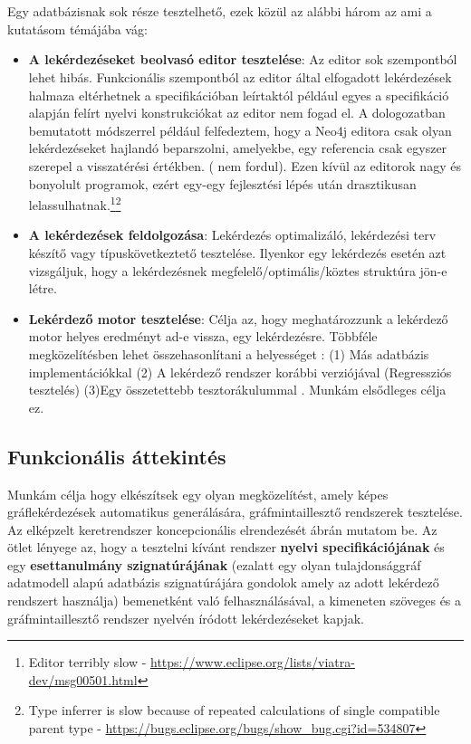 \chapter{\attekintes}

Egy adatbázisnak sok része tesztelhető, ezek közül az alábbi három az ami a kutatásom témájába vág:
\begin{itemize}
	\item  \textbf{A lekérdezéseket beolvasó editor tesztelése}: Az editor sok szempontból lehet hibás. Funkcionális szempontból az editor által elfogadott lekérdezések halmaza eltérhetnek a specifikációban leírtaktól például egyes a specifikáció alapján felírt nyelvi konstrukciókat az editor nem fogad el. A dologozatban bemutatott módszerrel például felfedeztem, hogy a Neo4j  editora csak olyan lekérdezéseket hajlandó beparszolni, amelyekbe, egy referencia csak egyszer szerepel a visszatérési értékben. ( nem fordul). Ezen kívül az editorok nagy és bonyolult programok, ezért egy-egy fejlesztési lépés után drasztikusan lelassulhatnak.\footnote{Editor terribly slow - \url{https://www.eclipse.org/lists/viatra-dev/msg00501.html}}\footnote{Type inferrer is slow because of repeated calculations of single compatible parent type - \url{https://bugs.eclipse.org/bugs/show_bug.cgi?id=534807}}
	\item \textbf{A lekérdezések feldolgozása}: Lekérdezés optimalizáló, lekérdezési terv készítő vagy típuskövetkeztető tesztelése. Ilyenkor egy lekérdezés esetén azt vizsgáljuk, hogy a lekérdezésnek megfelelő/optimális/köztes struktúra jön-e létre.
	\item \textbf{Lekérdező motor tesztelése}:  Célja az, hogy meghatározzunk a lekérdező motor helyes eredményt ad-e vissza, egy lekérdezésre. Többféle megközelítésben lehet összehasonlítani a helyességet : (1) Más adatbázis implementációkkal (2) A lekérdező rendszer korábbi verziójával (Regressziós tesztelés) \cite{yan2018snowtrail} (3)Egy összetettebb tesztorákulummal \cite{DBLP}. Munkám elsődleges célja ez.
\end{itemize}



\section{Funkcionális áttekintés}

Munkám célja hogy elkészítsek egy olyan megközelítést, amely képes gráflekérdezések automatikus generálására, gráfmintaillesztő rendszerek tesztelése. Az elképzelt  keretrendszer koncepcionális elrendezését   ábrán mutatom be. Az ötlet lényege az, hogy a tesztelni kívánt rendszer \textbf{nyelvi specifikációjának} és egy \textbf{esettanulmány szignatúrájának} (ezalatt egy olyan tulajdonsággráf adatmodell alapú adatbázis szignatúrájára gondolok amely az adott lekérdező rendszert használja) bemenetként való felhasználásával, a kimeneten szöveges és a gráfmintaillesztő rendszer nyelvén íródott lekérdezéseket kapjak. 

